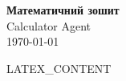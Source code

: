 \documentclass[12pt,a4paper]{article}
\theoremstyle{definition}
\begin{document}
\begin{center}
    {\Large \textbf{Математичний зошит}}\\[0.5cm]
    {\large Calculator Agent}\\[0.3cm]
    \today
\end{center}

\vspace{1cm}

{LATEX_CONTENT}
\end{document}

